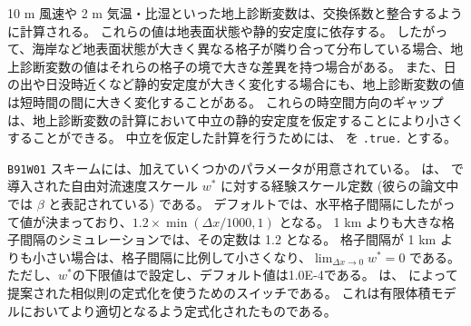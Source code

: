 10 m 風速や 2 m 気温・比湿といった地上診断変数は、交換係数と整合するように計算される。
これらの値は地表面状態や静的安定度に依存する。
したがって、海岸など地表面状態が大きく異なる格子が隣り合って分布している場合、地上診断変数の値はそれらの格子の境で大きな差異を持つ場合がある。
また、日の出や日没時近くなど静的安定度が大きく変化する場合にも、地上診断変数の値は短時間の間に大きく変化することがある。
これらの時空間方向のギャップは、地上診断変数の計算において中立の静的安定度を仮定することにより小さくすることができる。
中立を仮定した計算を行うためには、 を \verb|.true.| とする。


\verb|B91W01| スキームには、加えていくつかのパラメータが用意されている。
 は、\citet{beljaars_1994} で導入された自由対流速度スケール $w^{\ast}$ に対する経験スケール定数 (彼らの論文中では $\beta$ と表記されている) である。
デフォルトでは、水平格子間隔にしたがって値が決まっており、$1.2 \times \min(\Delta x/1000, 1)$ となる。
1 km よりも大きな格子間隔のシミュレーションでは、その定数は 1.2 となる。
格子間隔が 1 km よりも小さい場合は、格子間隔に比例して小さくなり、$\lim_{\Delta x\to0}w^{\ast}=0$ である。
ただし、$w^{\ast}$の下限値はで設定し、デフォルト値は1.0E-4である。
 は、\citet{nishizawa_2018} によって提案された相似則の定式化を使うためのスイッチである。
これは有限体積モデルにおいてより適切となるよう定式化されたものである。
